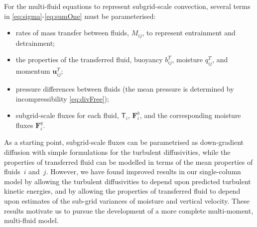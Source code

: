 \documentclass[11pt,a4paper]{article}
\begin{document}

For the multi-fluid equations to represent subgrid-scale convection, several terms in \eqref{eq:sigma}-\eqref{eq:sumOne} must be parameterised:
\begin{itemize}
\item rates of mass transfer between fluids, $M_{ij}$, to represent entrainment and detrainment;
\item the properties of the transferred fluid, buoyancy $b_{ij}^T$, moisture $q_{ij}^T$, and momentum $\mathbf{u}_{ij}^T$; 
\item pressure differences between fluids (the mean pressure is determined by incompressibility \eqref{eq:divFree});
\item subgrid-scale fluxes for each fluid, $\mathsf{T}_i$, $\mathbf{F}^b_{i}$, and the corresponding moisture fluxes $\mathbf{F}^q_{i}$.
\end{itemize}

As a starting point, subgrid-scale fluxes can be parametrised as down-gradient diffusion with simple formulations for the turbulent diffusivities,
while the properties of transferred fluid can be modelled in terms of the mean properties of fluids~$i$ and~$j$. 
However, we have found improved results in our single-column model by allowing the turbulent diffusivities to depend upon predicted turbulent
kinetic energies, and by allowing the properties of transferred fluid to depend upon estimates of the sub-grid variances of moisture and vertical velocity.
These results motivate us to pursue the development of a more complete multi-moment, multi-fluid model.


\end{document}
